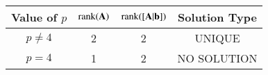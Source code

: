 \begin{tabular}{|c|c|c|c|}
    \hline
    Value of $p$ & $\text{rank}(\mathbf{A})$ & $\text{rank}([\mathbf{A}|\mathbf{b}])$ &  Solution Type \\
    \hline
    $p \neq 4$ & 2 & 2 & UNIQUE \\
    $p = 4$ & 1 & 2 & NO SOLUTION \\
    \hline
\end{tabular}